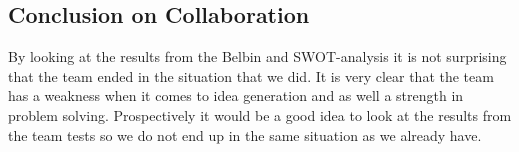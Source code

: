 \subsection{Conclusion on Collaboration}
By looking at the results from the Belbin and SWOT-analysis it is not surprising that the team ended in the situation that we did. It is very clear that the team has a weakness when it comes to idea generation and as well a strength in problem solving. Prospectively it would be a good idea to look at the results from the team tests so we do not end up in the same situation as we already have.

